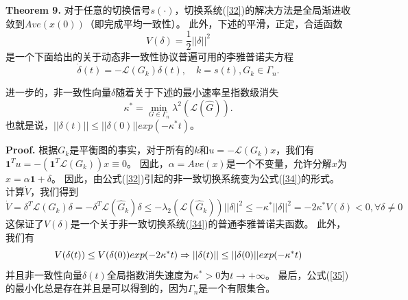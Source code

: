 \documentclass{article}
\begin{document}
\noindent \textbf{Theorem 9.} 对于任意的切换信号$s(\cdot)$，切换系统(\ref{32})的解决方法是全局渐进收敛到$Ave(x(0))$（即完成平均一致性）。
此外，下述的平滑，正定，合适函数
\begin{equation}
    V(\delta) = \frac{1}{2}||\delta||^2
    \label{33}
    \tag{33}
\end{equation}
是一个下面给出的关于动态非一致性协议普遍可用的李雅普诺夫方程
\begin{equation}
    \dot{\delta}(t) = -\mathcal{L}(G_k)\delta(t),\quad k=s(t),G_k\in \Gamma_n.
    \tag{34}
    \label{34}
\end{equation}

进一步的，非一致性向量$\delta$随着关于下述的最小速率呈指数级消失
\begin{equation}
    \kappa^* = \min_{G\in \Gamma_n} \lambda^2(\mathcal{L}(\hat{G})).
    \tag{35}
    \label{35}
\end{equation}
也就是说，$||\delta(t)||\le ||\delta(0)||exp(-\kappa^*t)$。

\noindent \textbf{Proof.}
根据$G_k$是平衡图的事实，对于所有的$k$和$u=-\mathcal{L}(G_k)x$，我们有$\mathbf{1}^Tu=-(\mathbf{1}^T\mathcal{L}(G_k))x\equiv0$。
因此，$\alpha=Ave(x)$是一个不变量，允许分解$x$为$x=\alpha \mathbf{1}+\delta$。
因此，由公式(\ref{32})引起的非一致切换系统变为公式(\ref{34})的形式。
计算$\dot{V}$，我们得到
\begin{equation}
    \tag{36}
    \label{36}
    \dot{V} = \delta^T\mathcal{L}(G_k)\delta = -\delta^T\mathcal{L}(\hat{G}_k)\delta \le -\lambda_2(\mathcal{L}(\hat{G}_k))||\delta||^2 \le -\kappa^*||\delta||^2 = -2\kappa^*V(\delta)<0,\forall \delta \ne 0
\end{equation}
这保证了$V(\delta)$是一个关于非一致切换系统(\ref{34})的普通李雅普诺夫函数。
此外，我们有
\begin{equation}
    \notag
    V(\delta(t)) \le V(\delta(0))exp(-2\kappa^*t) \Rightarrow ||\delta(t)|| \le ||\delta(0)||exp(-\kappa^*t)
\end{equation}
并且非一致性向量$\delta(t)$全局指数消失速度为$\kappa^* > 0$为$t\rightarrow +\infty$。
最后，公式(\ref{35})的最小化总是存在并且是可以得到的，因为$\Gamma_n$是一个有限集合。
\end{document}
